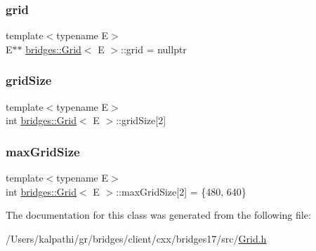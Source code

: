 \subsubsection{\texorpdfstring{grid}{grid}}
{\footnotesize\ttfamily template$<$typename E$>$ \\
E$\ast$$\ast$ \mbox{\hyperlink{classbridges_1_1_grid}{bridges\+::\+Grid}}$<$ E $>$\+::grid = nullptr\hspace{0.3cm}{\ttfamily [protected]}}

\mbox{\label{classbridges_1_1_grid_af7c3a077b54e3346621e54276c1fa13e}} 
\subsubsection{\texorpdfstring{grid\+Size}{gridSize}}
{\footnotesize\ttfamily template$<$typename E$>$ \\
int \mbox{\hyperlink{classbridges_1_1_grid}{bridges\+::\+Grid}}$<$ E $>$\+::grid\+Size\mbox{[}2\mbox{]}\hspace{0.3cm}{\ttfamily [protected]}}

\mbox{\label{classbridges_1_1_grid_a800909a94e0affac82da79cf3e6d03e5}} 
\subsubsection{\texorpdfstring{max\+Grid\+Size}{maxGridSize}}
{\footnotesize\ttfamily template$<$typename E$>$ \\
int \mbox{\hyperlink{classbridges_1_1_grid}{bridges\+::\+Grid}}$<$ E $>$\+::max\+Grid\+Size\mbox{[}2\mbox{]} = \{480, 640\}\hspace{0.3cm}{\ttfamily [protected]}}



The documentation for this class was generated from the following file\+:\begin{DoxyCompactItemize}
\item 
/\+Users/kalpathi/gr/bridges/client/cxx/bridges17/src/\mbox{\hyperlink{_grid_8h}{Grid.\+h}}\end{DoxyCompactItemize}
